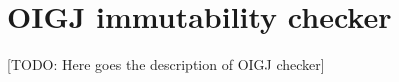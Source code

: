 \htmlhr
\chapter{OIGJ immutability checker\label{oigj-checker}}

[TODO: Here goes the description of OIGJ checker]


